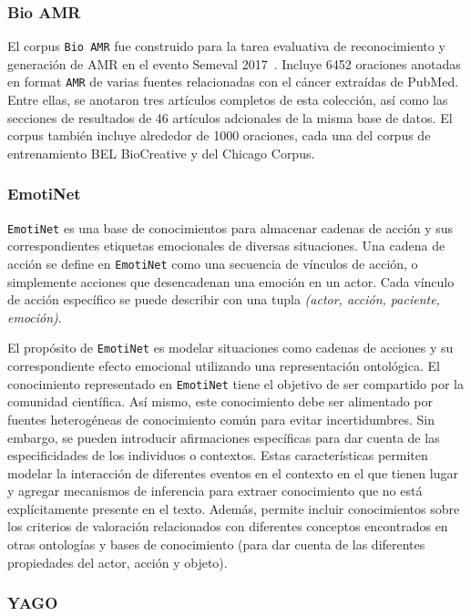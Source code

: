 \subsubsection*{Bio AMR}

El corpus \texttt{Bio AMR} fue construido para la tarea evaluativa de reconocimiento y generación de AMR en el evento Semeval 2017~\cite{}.
Incluye 6452 oraciones anotadas en format \texttt{AMR} de varias fuentes relacionadas con el cáncer extraídas de PubMed.
Entre ellas, se anotaron tres artículos completos de esta colección, así como las secciones de resultados de 46 artículos adcionales de la misma base de datos.
El corpus también incluye alrededor de 1000 oraciones, cada una del corpus de entrenamiento BEL BioCreative y del Chicago Corpus.

\subsubsection*{EmotiNet}

\texttt{EmotiNet} es una base de conocimientos para almacenar cadenas de acción y sus correspondientes etiquetas emocionales de diversas situaciones.
Una cadena de acción se define en \texttt{EmotiNet} como una secuencia de vínculos de acción, o simplemente acciones que desencadenan una emoción en un actor.
Cada vínculo de acción específico se puede describir con una tupla \textit{(actor, acción, paciente, emoción)}.

El propósito de \texttt{EmotiNet} es modelar situaciones como cadenas de acciones y su correspondiente efecto emocional utilizando una representación ontológica.
El conocimiento representado en \texttt{EmotiNet} tiene el objetivo de ser compartido por la comunidad científica.
Así mismo, este conocimiento debe ser alimentado por fuentes heterogéneas de conocimiento común para evitar incertidumbres.
Sin embargo, se pueden introducir afirmaciones específicas para dar cuenta de las especificidades de los individuos o contextos.
Estas características permiten modelar la interacción de diferentes eventos en el contexto en el que tienen lugar y agregar mecanismos de inferencia para extraer conocimiento que no está explícitamente presente en el texto.
Además, permite incluir conocimientos sobre los criterios de valoración relacionados con diferentes conceptos encontrados en otras ontologías y bases de conocimiento (para dar cuenta de las diferentes propiedades del actor, acción y objeto).

\subsubsection*{YAGO}

